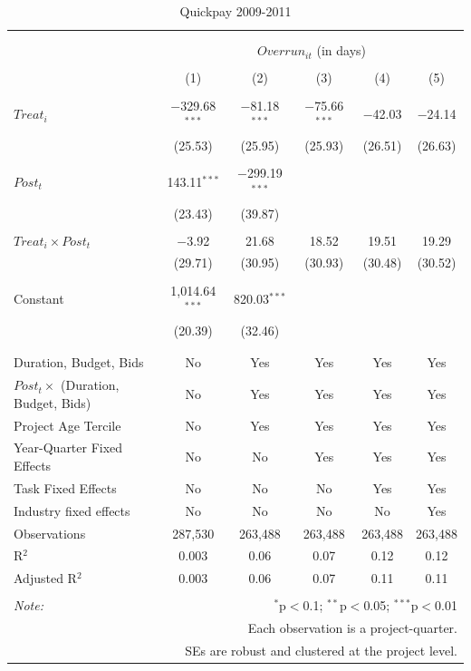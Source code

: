 \documentclass[
]{article}
\begin{document}
\begin{table}[H] \centering 
  \caption{Quickpay 2009-2011} 
  \label{} 
\small 
\begin{tabular}{@{\extracolsep{-2pt}}lccccc} 
\\[-1.8ex]\hline 
\hline \\[-1.8ex] 
\\[-1.8ex] & \multicolumn{5}{c}{$Overrun_{it}$ (in days)} \\ 
\\[-1.8ex] & (1) & (2) & (3) & (4) & (5)\\ 
\hline \\[-1.8ex] 
 $Treat_i$ & $-$329.68$^{***}$ & $-$81.18$^{***}$ & $-$75.66$^{***}$ & $-$42.03 & $-$24.14 \\ 
  & (25.53) & (25.95) & (25.93) & (26.51) & (26.63) \\ 
  & & & & & \\ 
 $Post_t$ & 143.11$^{***}$ & $-$299.19$^{***}$ &  &  &  \\ 
  & (23.43) & (39.87) &  &  &  \\ 
  & & & & & \\ 
 $Treat_i \times Post_t$ & $-$3.92 & 21.68 & 18.52 & 19.51 & 19.29 \\ 
  & (29.71) & (30.95) & (30.93) & (30.48) & (30.52) \\ 
  & & & & & \\ 
 Constant & 1,014.64$^{***}$ & 820.03$^{***}$ &  &  &  \\ 
  & (20.39) & (32.46) &  &  &  \\ 
  & & & & & \\ 
\hline \\[-1.8ex] 
Duration, Budget, Bids & No & Yes & Yes & Yes & Yes \\ 
$Post_t \times$  (Duration, Budget, Bids) & No & Yes & Yes & Yes & Yes \\ 
Project Age Tercile & No & Yes & Yes & Yes & Yes \\ 
Year-Quarter Fixed Effects & No & No & Yes & Yes & Yes \\ 
Task Fixed Effects & No & No & No & Yes & Yes \\ 
Industry fixed effects & No & No & No & No & Yes \\ 
Observations & 287,530 & 263,488 & 263,488 & 263,488 & 263,488 \\ 
R$^{2}$ & 0.003 & 0.06 & 0.07 & 0.12 & 0.12 \\ 
Adjusted R$^{2}$ & 0.003 & 0.06 & 0.07 & 0.11 & 0.11 \\ 
\hline 
\hline \\[-1.8ex] 
\textit{Note:}  & \multicolumn{5}{r}{$^{*}$p$<$0.1; $^{**}$p$<$0.05; $^{***}$p$<$0.01} \\ 
 & \multicolumn{5}{r}{Each observation is a project-quarter.} \\ 
 & \multicolumn{5}{r}{SEs are robust and clustered at the project level.} \\ 
\end{tabular} 
\end{table}
\end{document}
